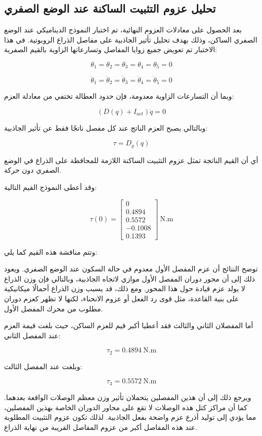 \subsection{تحليل عزوم التثبيت الساكنة عند الوضع الصفري}

بعد الحصول على معادلات العزوم النهائية، تم اختبار النموذج الديناميكي عند الوضع الصفري الساكن، وذلك بهدف تحليل تأثير الجاذبية على مفاصل الذراع الروبوتية. في هذا الاختبار تم تعويض جميع زوايا المفاصل وتسارعاتها الزاوية بالقيم الصفرية:

\[
\theta_1=\theta_2=\theta_3=\theta_4=\theta_5=0
\]

\[
\ddot{\theta}_1=\ddot{\theta}_2=\ddot{\theta}_3=\ddot{\theta}_4=\ddot{\theta}_5=0
\]

وبما أن التسارعات الزاوية معدومة، فإن حدود العطالة تختفي من معادلة العزم:

\[
\left(D(q)+I_{act}\right)\ddot{q}=0
\]

وبالتالي يصبح العزم الناتج عند كل مفصل ناتجًا فقط عن تأثير الجاذبية:

\[
\tau = D_g(q)
\]

أي أن القيم الناتجة تمثل عزوم التثبيت الساكنة اللازمة للمحافظة على الذراع في الوضع الصفري دون حركة.

وقد أعطى النموذج القيم التالية:

\[
\tau(0)=
\begin{bmatrix}
0\\
0.4894\\
0.5572\\
-0.1008\\
0.1393
\end{bmatrix}
\ \mathrm{N.m}
\]

وتتم مناقشة هذه القيم كما يلي:


توضح النتائج أن عزم المفصل الأول معدوم في حالة السكون عند الوضع الصفري. ويعود ذلك إلى أن محور دوران المفصل الأول موازي لاتجاه الجاذبية، وبالتالي فإن وزن الذراع لا يولد عزم قيادة حول هذا المحور. ومع ذلك، قد يسبب وزن الذراع أحمالًا ميكانيكية على بنية القاعدة، مثل قوى رد الفعل أو عزوم الانحناء، لكنها لا تظهر كعزم دوران مطلوب من محرك المفصل الأول.

أما المفصلان الثاني والثالث فقد أعطيا أكبر قيم للعزم الساكن، حيث بلغت قيمة العزم عند المفصل الثاني:

\[
\tau_2 = 0.4894\ \mathrm{N.m}
\]

وبلغت عند المفصل الثالث:

\[
\tau_3 = 0.5572\ \mathrm{N.m}
\]

ويرجع ذلك إلى أن هذين المفصلين يتحملان تأثير وزن معظم الوصلات الواقعة بعدهما. كما أن مراكز كتل هذه الوصلات لا تقع على محاور الدوران الخاصة بهذين المفصلين، مما يؤدي إلى توليد أذرع عزم واضحة بفعل الجاذبية. لذلك تكون عزوم التثبيت المطلوبة عند هذه المفاصل أكبر من عزوم المفاصل القريبة من نهاية الذراع.

